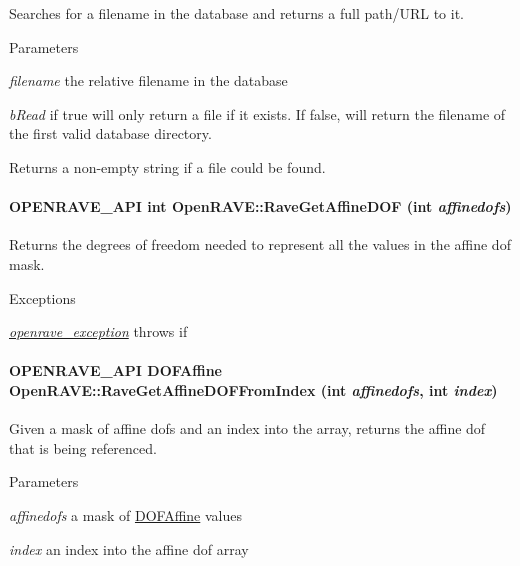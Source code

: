 Searches for a filename in the database and returns a full path/URL to it. 


\begin{DoxyParams}{Parameters}
\item[{\em filename}]the relative filename in the database \item[{\em bRead}]if true will only return a file if it exists. If false, will return the filename of the first valid database directory. \end{DoxyParams}
\begin{DoxyReturn}{Returns}
a non-\/empty string if a file could be found. 
\end{DoxyReturn}
\hypertarget{namespaceOpenRAVE_a240dc0d7e6ff803758ece938c97ecb09}{
\paragraph[{RaveGetAffineDOF}]{\setlength{\rightskip}{0pt plus 5cm}OPENRAVE\_\-API int OpenRAVE::RaveGetAffineDOF (int {\em affinedofs})}\hfill}
\label{namespaceOpenRAVE_a240dc0d7e6ff803758ece938c97ecb09}


Returns the degrees of freedom needed to represent all the values in the affine dof mask. 


\begin{DoxyExceptions}{Exceptions}
\item[{\em \hyperlink{classOpenRAVE_1_1openrave__exception}{openrave\_\-exception}}]throws if \end{DoxyExceptions}
\hypertarget{namespaceOpenRAVE_adf2141071a66cfbcbe55a64ade70e9d8}{
\paragraph[{RaveGetAffineDOFFromIndex}]{\setlength{\rightskip}{0pt plus 5cm}OPENRAVE\_\-API {\bf DOFAffine} OpenRAVE::RaveGetAffineDOFFromIndex (int {\em affinedofs}, \/  int {\em index})}\hfill}
\label{namespaceOpenRAVE_adf2141071a66cfbcbe55a64ade70e9d8}


Given a mask of affine dofs and an index into the array, returns the affine dof that is being referenced. 


\begin{DoxyParams}{Parameters}
\item[{\em affinedofs}]a mask of \hyperlink{namespaceOpenRAVE_a3016e2185103f3c1bdc5e4482893ca98}{DOFAffine} values \item[{\em index}]an index into the affine dof array \end{DoxyParams}

